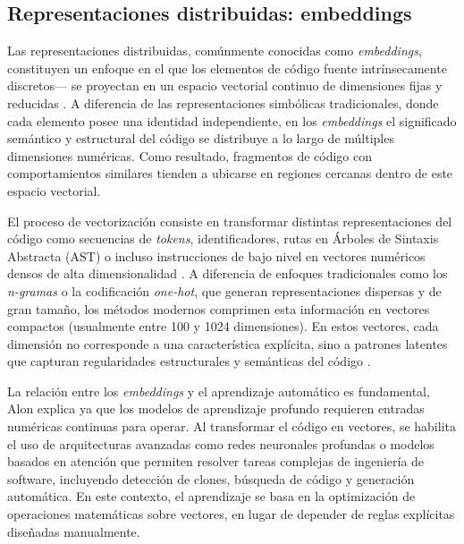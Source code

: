 \subsection{Representaciones distribuidas: embeddings}

Las representaciones distribuidas, comúnmente conocidas como \textit{embeddings}, constituyen un enfoque en el que los elementos de código fuente intrínsecamente discretos— se proyectan en un espacio vectorial continuo de dimensiones fijas y reducidas \cite{Alon2018Code2Vec}. A diferencia de las representaciones simbólicas tradicionales, donde cada elemento posee una identidad independiente, en los \textit{embeddings} el significado semántico y estructural del código se distribuye a lo largo de múltiples dimensiones numéricas. Como resultado, fragmentos de código con comportamientos similares tienden a ubicarse en regiones cercanas dentro de este espacio vectorial\cite{Alon2018Code2Vec}.

El proceso de vectorización consiste en transformar distintas representaciones del código como secuencias de \textit{tokens}, identificadores, rutas en Árboles de Sintaxis Abstracta (AST) o incluso instrucciones de bajo nivel en vectores numéricos densos de alta dimensionalidad \cite{Alon2018Code2Vec}. A diferencia de enfoques tradicionales como los \textit{n-gramas} o la codificación \textit{one-hot}, que generan representaciones dispersas y de gran tamaño, los métodos modernos comprimen esta información en vectores compactos (usualmente entre 100 y 1024 dimensiones)\cite{Alon2018Code2Vec}. En estos vectores, cada dimensión no corresponde a una característica explícita, sino a patrones latentes que capturan regularidades estructurales y semánticas del código \cite{Gagnon2025Beyond}.

La relación entre los \textit{embeddings} y el aprendizaje automático es fundamental, Alon \cite{Alon2018Code2Vec} explica ya que los modelos de aprendizaje profundo requieren entradas numéricas continuas para operar. Al transformar el código en vectores, se habilita el uso de arquitecturas avanzadas como redes neuronales profundas o modelos basados en atención que permiten resolver tareas complejas de ingeniería de software, incluyendo detección de clones, búsqueda de código y generación automática. En este contexto, el aprendizaje se basa en la optimización de operaciones matemáticas sobre vectores, en lugar de depender de reglas explícitas diseñadas manualmente.

